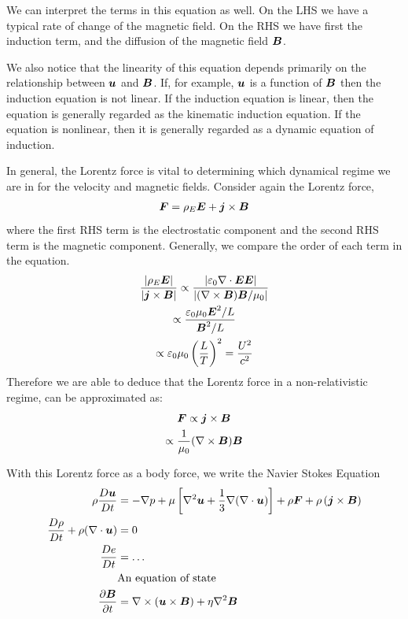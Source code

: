 \documentclass{article}
\begin{document}
We can interpret the terms in this equation as well. On the LHS we have a
typical rate of change of the magnetic field. On the RHS we have first the
induction term, and the diffusion of the magnetic field $\boldsymbol{B}$. 

We also notice that the linearity of this equation depends primarily on the
relationship between $\boldsymbol{u}$ and $\boldsymbol{B}$. If, for example, $\boldsymbol{u}$ is a function of
$\boldsymbol{B}$ then the induction equation is not linear. If the induction equation is
linear, then the equation is generally regarded as the kinematic induction
equation. If the equation is nonlinear, then it is generally regarded as a
dynamic equation of induction. 

In general, the Lorentz force is vital to determining which dynamical regime we
are in for the velocity and magnetic fields. Consider again the Lorentz force, 
\begin{gather*}
    \boldsymbol{F} = \rho_E \boldsymbol{E} + \boldsymbol{j}\times\boldsymbol{B}
\end{gather*}
where the first RHS term is the electrostatic component and the second RHS term
is the magnetic component. Generally, we compare the order of each term in the
equation. 
\begin{gather*}
    \frac{|\rho_E\boldsymbol{E}|}{|\boldsymbol{j}\times\boldsymbol{B}|} \propto
    \frac{|\varepsilon_0\nabla \cdot{\boldsymbol{E}}\boldsymbol{E}|}{|(\nabla\times\boldsymbol{B})\boldsymbol{B}/\mu_0|}\\
    \propto \frac{\varepsilon_0\mu_0\boldsymbol{E}^2/L}{\boldsymbol{B}^2/L} \\
    \propto \varepsilon_0\mu_0\left(\frac{L}{T}\right)^2 = \frac{U^2}{c^2}
\end{gather*}
Therefore we are able to deduce that the Lorentz force in a non-relativistic
regime, can be approximated as:
\begin{gather*}
    \boldsymbol{F} \propto \boldsymbol{j}\times\boldsymbol{B}\\
    \propto \frac{1}{\mu_0}(\nabla\times\boldsymbol{B})\boldsymbol{B}
\end{gather*}

With this Lorentz force as a body force, we write the Navier Stokes Equation
\begin{align*}
    \rho\frac{D \boldsymbol{u}}{D t} &= -\nabla p + \mu\left[\nabla^2\boldsymbol{u} +
    \frac{1}{3}\nabla(\nabla \cdot{\boldsymbol{u}})\right] + \rho\boldsymbol{F} +
    \rho\left(\boldsymbol{j}\times\boldsymbol{B}\right)\\
    \frac{D \rho}{D t} + \rho(\nabla\cdot\boldsymbol{u}) &= 0\\
    \frac{D e}{D t} &= \ldots\\
    &\text{An equation of state}\\
    \frac{\partial \boldsymbol{B}}{\partial t} &= \nabla\times(\boldsymbol{u}\times\boldsymbol{B}) + \eta\nabla^2\boldsymbol{B}
\end{align*}
\end{document}
